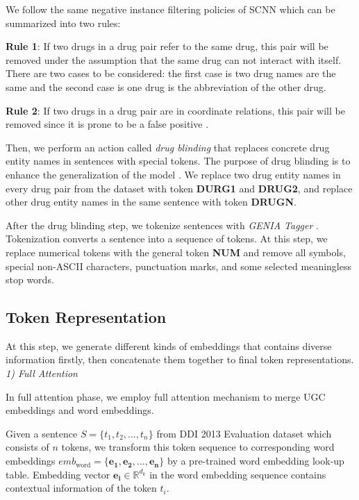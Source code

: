 \documentclass[conference]{IEEEtran}
\begin{document}
We follow the same negative instance filtering policies of SCNN \cite{zhao_drug_2016} which can be summarized into two rules:

\begin{framed}
\textbf{Rule 1}: If two drugs in a drug pair refer to the same drug,
this pair will be removed under the assumption that the same drug can not interact with itself.
There are two cases to be considered: the first case is two drug names are the same and the second case is one drug is the abbreviation of the other drug.

\bigbreak

\textbf{Rule 2}: If two drugs in a drug pair are in coordinate relations,
this pair will be removed since it is prone to be a false positive \cite{segura-bedmar_lessons_2014}.
\end{framed}

Then, we perform an action called \emph{drug blinding} that replaces concrete drug entity names in sentences with special tokens.
The purpose of drug blinding is to enhance the generalization of the model \cite{liu_drug-drug_2016}.
We replace two drug entity names in every drug pair from the dataset with token \textbf{DURG1} and \textbf{DRUG2},
and replace other drug entity names in the same sentence with token \textbf{DRUGN}.

After the drug blinding step, we tokenize sentences with \emph{GENIA Tagger} \cite{tsuruoka_genia_2006}.
Tokenization converts a sentence into a sequence of tokens.
At this step, we replace numerical tokens with the general token \textbf{NUM} and remove all symbols,
special non-ASCII characters, punctuation marks, and some selected meaningless stop words.

\subsection{Token Representation}

At this step, we generate different kinds of embeddings that contains diverse information firstly,
then concatenate them together to final token representations.\\

\emph{1) Full Attention}

\bigbreak

In full attention phase, we employ full attention mechanism to merge UGC embeddings and word embeddings.

Given a sentence $S = \{t_1, t_2, \dots, t_n\}$ from DDI 2013 Evaluation dataset
which consists of $n$ tokens, we transform this token sequence to corresponding word embeddings
$emb_{\text{word}} = \{ \bm{e_1}, \bm{e_2}, \dots, \bm{e_n} \}$ by a pre-trained word embedding look-up table.
Embedding vector $\bm{e_i} \in \mathbb{R}^{d_{k}}$ in the word embedding sequence contains contextual information of the token $t_i$.
\end{document}
